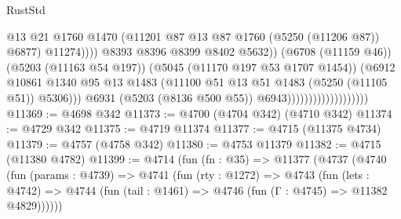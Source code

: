 \begin{lexlean}{RustStd}
\begin{coremodule}
                                                        @13
                                                        @21
                                                        @1760
                                                        @1470
                                                        (@11201
                                                          @87
                                                          @13
                                                          @87
                                                          @1760
                                                          (@5250 (@11206 @87))
                                                          @6877)
                                                        @11274))))
                                                @8393
                                                @8396
                                                @8399
                                                @8402
                                                @5632))
                                            (@6708 (@11159 @46))
                                            (@5203 (@11163 @54 @197))
                                            (@5045 (@11170 @197 @53 @1707 @1454))
                                            (@6912
                                              @10861
                                              @1340
                                              @95
                                              @13
                                              @1483
                                              (@11100
                                                @51
                                                @13
                                                @51
                                                @1483
                                                (@5250 (@11105 @51))
                                                @5306)))
                                          @6931
                                          (@5203 (@8136 @500 @55))
                                          @6943)))))))))))))))))))
@11369 := @4698 @342
@11373 := @4700 (@4704 @342) (@4710 @342)
@11374 := @4729 @342
@11375 := @4719 @11374
@11377 := @4715 (@11375 @4734)
@11379 := @4757 (@4758 @342)
@11380 := @4753 @11379
@11382 := @4715 (@11380 @4782)
@11399 := @4714
    (fun (fn : @35) =>
    @11377
      (@4737
        (@4740
          (fun (params : @4739) =>
          @4741
            (fun (rty : @1272) =>
            @4743
              (fun (lets : @4742) =>
              @4744 (fun (tail : @1461) => @4746 (fun (Γ : @4745) => @11382 @4829))))))

\end{coremodule}
\end{lexlean}

